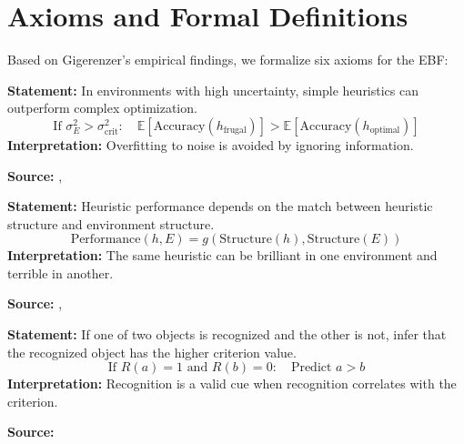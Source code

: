 \section{Axioms and Formal Definitions}
\label{sec:gi-axioms}

Based on Gigerenzer's empirical findings, we formalize six axioms for the EBF:

\begin{tcolorbox}[colback=gray!5!white, colframe=gray!75!black,
    title=Axiom UNMAPPED_GI-1: Less-is-More Effect]
\textbf{Statement:} In environments with high uncertainty, simple heuristics can outperform complex optimization.
\begin{equation}
\text{If } \sigma^2_E > \sigma^2_{\text{crit}}: \quad \mathbb{E}[\text{Accuracy}(h_{\text{frugal}})] > \mathbb{E}[\text{Accuracy}(h_{\text{optimal}})]
\end{equation}
\textbf{Interpretation:} Overfitting to noise is avoided by ignoring information.

\textbf{Source:} \citet{gigerenzer1999simple}, \citet{gigerenzer2009homo}
\end{tcolorbox}

\begin{tcolorbox}[colback=gray!5!white, colframe=gray!75!black,
    title=Axiom UNMAPPED_GI-2: Ecological Rationality]
\textbf{Statement:} Heuristic performance depends on the match between heuristic structure and environment structure.
\begin{equation}
\text{Performance}(h, E) = g(\text{Structure}(h), \text{Structure}(E))
\end{equation}
\textbf{Interpretation:} The same heuristic can be brilliant in one environment and terrible in another.

\textbf{Source:} \citet{gigerenzer2001bounded}, \citet{goldstein2002recognition}
\end{tcolorbox}

\begin{tcolorbox}[colback=gray!5!white, colframe=gray!75!black,
    title=Axiom UNMAPPED_GI-3: Recognition Heuristic]
\textbf{Statement:} If one of two objects is recognized and the other is not, infer that the recognized object has the higher criterion value.
\begin{equation}
\text{If } R(a) = 1 \text{ and } R(b) = 0: \quad \text{Predict } a > b
\end{equation}
\textbf{Interpretation:} Recognition is a valid cue when recognition correlates with the criterion.

\textbf{Source:} \citet{goldstein2002recognition}
\end{tcolorbox}

